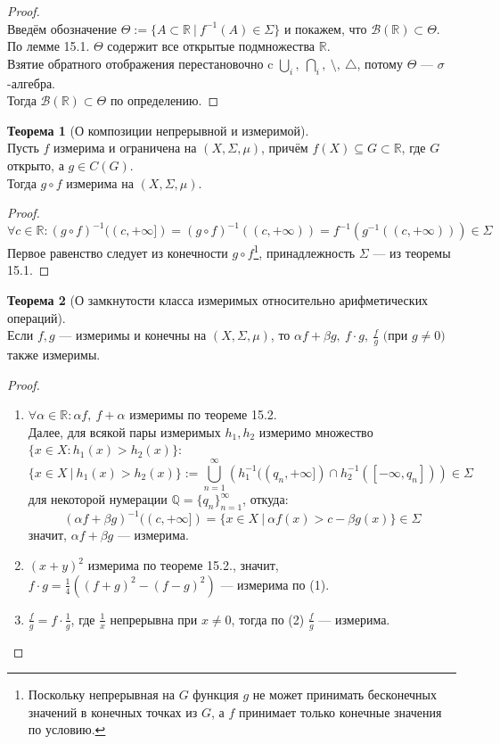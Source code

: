 \documentclass[11pt,a4paper]{report}
\def\Real{\mathbb{R}}
\def\Rational{\mathbb{Q}}
\theoremstyle{definition}
\theoremstyle{definition}
\newtheorem{theorem}{Теорема}[section]
\theoremstyle{definition}
\begin{document}
	\begin{proof}$  $\\
		Введём обозначение $ \Theta := \{A \subset \Real\ |\ f^{-1}(A) \in \Sigma \} $ и покажем, что $ \mathcal{B}(\Real) \subset \Theta $.\\
		По лемме 15.1. $ \Theta $ содержит все открытые подмножества $ \Real $.\\ 
		Взятие обратного отображения перестановочно c $ \bigcup_{i},\ \bigcap_{i},\ \setminus,\ \triangle $, потому $ \Theta $ — $ \sigma $-алгебра.\\
		Тогда $ \mathcal{B}(\Real) \subset \Theta $ по определению.
	\end{proof}
	\begin{theorem}[О композиции непрерывной и измеримой]$  $\\
		 Пусть $ f $ измерима и ограничена на $ (X, \Sigma, \mu) $, причём $ f(X) \subseteq G \subset \Real $, где $ G $ открыто, а $ g \in C(G) $.\\
		 Тогда $ g \circ f $ измерима на $ (X, \Sigma, \mu) $.
	\end{theorem}
	\begin{proof}
		\[ \forall c \in \Real: (g \circ f)^{-1}((c, +\infty]) = (g \circ f)^{-1}((c, +\infty)) = f^{-1}(g^{-1}((c, +\infty))) \in \Sigma \]
		Первое равенство следует из конечности $ g \circ f $\footnote{Поскольку непрерывная на $ G $ функция $ g $ не может принимать бесконечных значений в конечных точках из $ G $, а $ f $ принимает только конечные значения по условию.}, принадлежность $ \Sigma $ — из теоремы 15.1.
	\end{proof}
	\begin{theorem}[О замкнутости класса измеримых относительно арифметических операций]$  $\\
		Если $ f, g $ — измеримы и конечны на $ (X, \Sigma, \mu) $, то $ \alpha f + \beta g,\ f \cdot g,\ \frac{f}{g} \mbox{ (при } g \neq 0) $ также измеримы.
	\end{theorem}
	\begin{proof}$  $
		\begin{enumerate}[(1)]
			\item $ \forall \alpha \in \Real: \alpha f,\ f + \alpha $ измеримы по теореме 15.2.\\
						Далее, для всякой пары измеримых $ h_{1}, h_{2} $ измеримо множество $ \{ x \in X: h_{1}(x) > h_{2}(x) \} $: 
						\[ \{x \in X\ |\  h_{1}(x) > h_{2}(x) \} := \bigcup\limits_{n=1}^{\infty}{\left ( h^{-1}_{1}((q_{n}, +\infty]) \cap h^{-1}_{2}([-\infty, q_{n}])\right ) } \in \Sigma \]
						для некоторой нумерации $ \Rational = \{q_{n}\}_{n=1}^{\infty} $, откуда: \[ (\alpha f + \beta g)^{-1}((c, +\infty]) = \{x \in X\ |\ \alpha f(x) > c - \beta g(x) \} \in \Sigma \]
						значит, $ \alpha f + \beta g $ — измерима.
			\item $ (x + y)^{2} $ измерима по теореме 15.2., значит, $ f \cdot g = \frac{1}{4}((f + g)^{2} - (f - g)^{2}) $ — измерима по (1).
			\item $ \frac{f}{g} = f \cdot \frac{1}{g} $, где $ \frac{1}{x} $ непрерывна при $ x \neq 0 $, тогда по (2) $ \frac{f}{g} $ — ­измерима.
		\end{enumerate}
	\end{proof}
\end{document}
